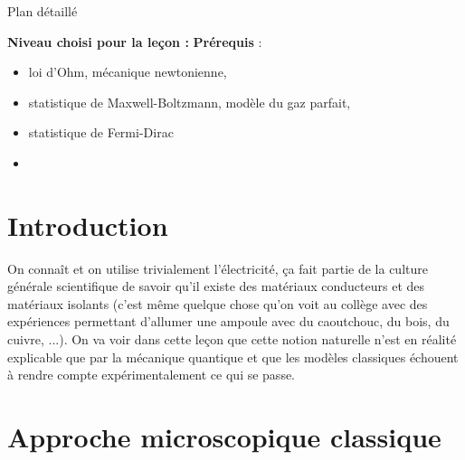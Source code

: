 \begin{reportBlock}{Plan détaillé}

  \textbf{Niveau choisi pour la leçon :} 
  \newline
  \textbf{Prérequis} : \begin{itemize}
  \item loi d'Ohm, mécanique newtonienne,
      \item statistique de Maxwell-Boltzmann, modèle du gaz parfait,
      \item statistique de Fermi-Dirac
      \item 
  \end{itemize}
  
\section*{Introduction}
On connaît et on utilise trivialement l’électricité, ça fait partie de la culture générale scientifique de savoir qu’il existe des matériaux conducteurs et des matériaux isolants (c'est même quelque chose qu'on voit au collège avec des expériences permettant d'allumer une ampoule avec du caoutchouc, du bois, du cuivre, ...). On va voir dans cette leçon que cette notion naturelle n'est en réalité explicable que par la mécanique quantique et que les modèles classiques échouent à rendre compte expérimentalement ce qui se passe.

\section{Approche microscopique classique}

\end{reportBlock}
